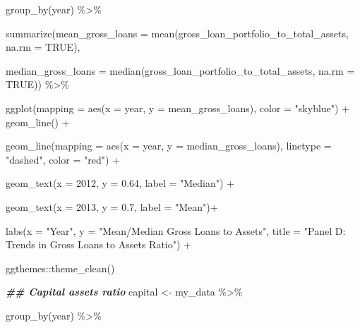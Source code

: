 \documentclass[a4paper,nobind]{templates/ociamthesis}
\newenvironment{Shaded}{\begin{snugshade}}{\end{snugshade}}
\newcommand{\AttributeTok}[1]{\textcolor[rgb]{0.77,0.63,0.00}{#1}}
\newcommand{\ConstantTok}[1]{\textcolor[rgb]{0.00,0.00,0.00}{#1}}
\newcommand{\DecValTok}[1]{\textcolor[rgb]{0.00,0.00,0.81}{#1}}
\newcommand{\DocumentationTok}[1]{\textcolor[rgb]{0.56,0.35,0.01}{\textbf{\textit{#1}}}}
\newcommand{\FloatTok}[1]{\textcolor[rgb]{0.00,0.00,0.81}{#1}}
\newcommand{\FunctionTok}[1]{\textcolor[rgb]{0.00,0.00,0.00}{#1}}
\newcommand{\NormalTok}[1]{#1}
\newcommand{\OtherTok}[1]{\textcolor[rgb]{0.56,0.35,0.01}{#1}}
\newcommand{\SpecialCharTok}[1]{\textcolor[rgb]{0.00,0.00,0.00}{#1}}
\newcommand{\StringTok}[1]{\textcolor[rgb]{0.31,0.60,0.02}{#1}}
\renewenvironment{Shaded}
{
  \vspace{10pt}%
  \begin{snugshade}%
}{%
  \end{snugshade}%
  \vspace{8pt}%
}
\begin{document}
\begin{Shaded}
\begin{Highlighting}[]
  \FunctionTok{group\_by}\NormalTok{(year) }\SpecialCharTok{\%\textgreater{}\%} 
  
  \FunctionTok{summarize}\NormalTok{(}\AttributeTok{mean\_gross\_loans =} \FunctionTok{mean}\NormalTok{(gross\_loan\_portfolio\_to\_total\_assets, }\AttributeTok{na.rm =} \ConstantTok{TRUE}\NormalTok{), }
                               
  \AttributeTok{median\_gross\_loans =} \FunctionTok{median}\NormalTok{(gross\_loan\_portfolio\_to\_total\_assets, }\AttributeTok{na.rm =} \ConstantTok{TRUE}\NormalTok{)) }\SpecialCharTok{\%\textgreater{}\%} 
  
  \FunctionTok{ggplot}\NormalTok{(}\AttributeTok{mapping =} \FunctionTok{aes}\NormalTok{(}\AttributeTok{x =}\NormalTok{ year, }\AttributeTok{y =}\NormalTok{ mean\_gross\_loans), }\AttributeTok{color =} \StringTok{"skyblue"}\NormalTok{) }\SpecialCharTok{+} \FunctionTok{geom\_line}\NormalTok{() }\SpecialCharTok{+}
  
  \FunctionTok{geom\_line}\NormalTok{(}\AttributeTok{mapping =} \FunctionTok{aes}\NormalTok{(}\AttributeTok{x =}\NormalTok{ year, }\AttributeTok{y =}\NormalTok{ median\_gross\_loans), }\AttributeTok{linetype =} \StringTok{"dashed"}\NormalTok{, }\AttributeTok{color =} \StringTok{"red"}\NormalTok{) }\SpecialCharTok{+}
  
  \FunctionTok{geom\_text}\NormalTok{(}\AttributeTok{x =} \DecValTok{2012}\NormalTok{, }\AttributeTok{y =} \FloatTok{0.64}\NormalTok{, }\AttributeTok{label =} \StringTok{"Median"}\NormalTok{) }\SpecialCharTok{+} 
  
  \FunctionTok{geom\_text}\NormalTok{(}\AttributeTok{x =} \DecValTok{2013}\NormalTok{, }\AttributeTok{y =} \FloatTok{0.7}\NormalTok{, }\AttributeTok{label =} \StringTok{"Mean"}\NormalTok{)}\SpecialCharTok{+}
  
  \FunctionTok{labs}\NormalTok{(}\AttributeTok{x =} \StringTok{"Year"}\NormalTok{, }\AttributeTok{y =} \StringTok{"Mean/Median Gross Loans to Assets"}\NormalTok{, }\AttributeTok{title =} \StringTok{"Panel D: Trends in Gross Loans to Assets Ratio"}\NormalTok{) }\SpecialCharTok{+} 
  
\NormalTok{  ggthemes}\SpecialCharTok{::}\FunctionTok{theme\_clean}\NormalTok{()}

\DocumentationTok{\#\# Capital assets ratio}
\NormalTok{capital }\OtherTok{\textless{}{-}}\NormalTok{ my\_data }\SpecialCharTok{\%\textgreater{}\%} 
  
  \FunctionTok{group\_by}\NormalTok{(year) }\SpecialCharTok{\%\textgreater{}\%} 
  

\end{Highlighting}
\end{Shaded}
\end{document}

